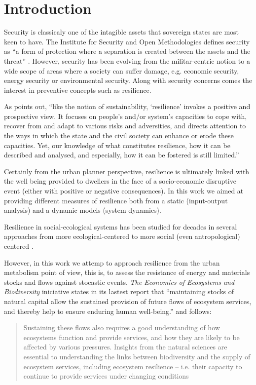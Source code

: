 \section{Introduction}
Security is classicaly one of the intagible assets that sovereign states are
most keen to have. The Institute for Security and Open Methodologies defines
security as ``a form of protection where a separation is created between the
assets and the threat'' \cite{ISECOM2010}. However, security has been evolving
from the militar-centric notion to a wide scope of areas where a society can
suffer damage, e.g. economic security, energy security or environmental
security. Along with security concerns comes the interest in preventive concepts
such as resilience. 

As \cite{Obrist2010} points out, ``like the notion of sustainability,
`resilience' invokes a positive and prospective view. It focuses on people’s and/or system’s
capacities to cope with, recover from and adapt to various risks and
adversities, and directs attention to the ways in which the state and the civil
society can enhance or erode these capacities. Yet, our knowledge of what
constitutes resilience, how it can be described and analysed, and especially,
how it can be fostered is still limited.''

Certainly from the urban planner perspective, resilience is ultimately
linked with the well being provided to dwellers in the face of a socio-economic
disruptive event (either with positive or negative consequences). In this work
we aimed at providing different measures of resilience both from a static
(input-output analysis) and a dynamic models (system dynamics).

Resilience in social-ecological systems has been studied for decades in several
approaches from more ecological-centered \citep{Holling1973} to more social
(even antropological) centered \citep{Bourdieu1995,Bourdieu1986}.

However, in this work we attemp to approach resilience from the urban metabolism
\citep{Wolman1965} point of view, this is, to assess the resistance of energy
and materials stocks and flows against stocastic events. \emph{The Economics of
Ecosystems and Biodiversity} iniciative states in its lastest report
\citep{TEEB2010} that ``maintaining stocks of natural capital allow the
sustained provision of future flows of ecosystem services, and thereby help to
ensure enduring human well-being.'' and follows:

\begin{quote}
Sustaining these flows also requires a good understanding of how
ecosystems function and provide services, and how they are likely to be
affected by various pressures. Insights from the natural sciences are essential
to understanding the links between biodiversity and the supply of ecosystem
services, including ecosystem resilience – i.e. their capacity to continue to
provide services under changing conditions
\end{quote}





